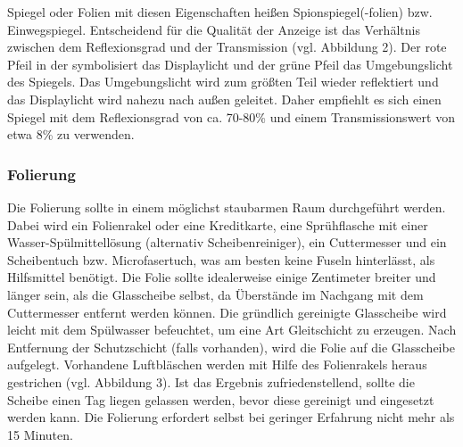 Spiegel oder Folien mit diesen Eigenschaften heißen Spionspiegel(-folien) bzw. Einwegspiegel. Entscheidend für die Qualität der Anzeige ist das Verhältnis zwischen dem Reflexionsgrad und der Transmission (vgl. Abbildung 2). Der rote Pfeil in der symbolisiert das Displaylicht und der grüne Pfeil das Umgebungslicht des Spiegels. Das Umgebungslicht wird zum größten Teil wieder reflektiert und das Displaylicht wird nahezu nach außen geleitet. Daher empfiehlt es sich einen Spiegel mit dem Reflexionsgrad von ca. 70-80\% und einem Transmissionswert von etwa 8\% zu verwenden. 


\subsubsection*{Folierung}
Die Folierung sollte in einem möglichst staubarmen Raum durchgeführt werden. Dabei wird 
ein Folienrakel oder eine Kreditkarte, eine Sprühflasche mit einer Wasser-Spülmittellösung (alternativ Scheibenreiniger), ein Cuttermesser und ein Scheibentuch bzw. Microfasertuch, was am besten keine Fuseln hinterlässt, als Hilfsmittel benötigt.
Die Folie sollte idealerweise einige Zentimeter breiter und länger sein, als die Glasscheibe selbst, da Überstände im Nachgang mit dem Cuttermesser entfernt werden können. Die gründlich gereinigte Glasscheibe wird leicht mit dem Spülwasser befeuchtet, um eine Art Gleitschicht zu erzeugen. Nach Entfernung der Schutzschicht (falls vorhanden), wird die Folie auf die Glasscheibe aufgelegt. Vorhandene Luftbläschen werden mit Hilfe des Folienrakels heraus gestrichen (vgl. Abbildung 3). Ist das Ergebnis zufriedenstellend, sollte die Scheibe einen Tag liegen gelassen werden, bevor diese gereinigt und eingesetzt werden kann. Die Folierung erfordert selbst bei geringer Erfahrung nicht mehr als 15 Minuten. 

